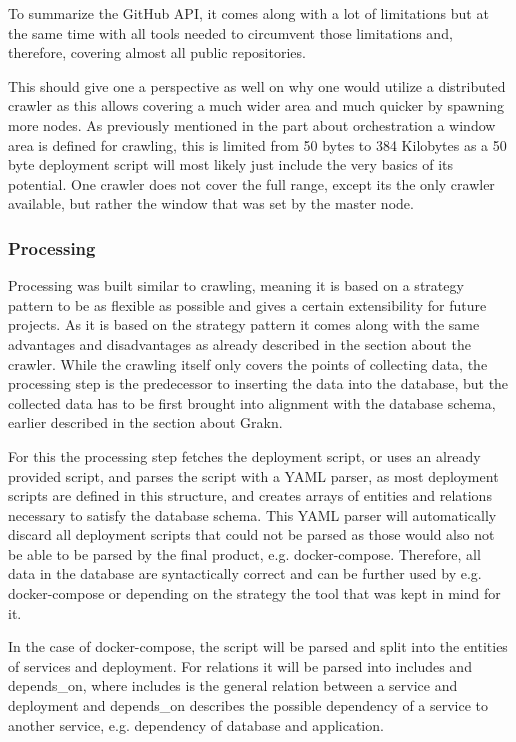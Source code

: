 To summarize the GitHub API, it comes along with a lot of limitations but at the same time with all tools needed to circumvent those limitations and, therefore, covering almost all public repositories.

This should give one a perspective as well on why one would utilize a distributed crawler as this allows covering a much wider area and much quicker by spawning more nodes. As previously mentioned in the part about orchestration a window area is defined for crawling, this is limited from 50 bytes to 384 Kilobytes as a 50 byte deployment script will most likely just include the very basics of its potential. One crawler does not cover the full range, except its the only crawler available, but rather the window that was set by the master node.

\subsubsection{Processing}
Processing was built similar to crawling, meaning it is based on a strategy pattern to be as flexible as possible and gives a certain extensibility for future projects. As it is based on the strategy pattern it comes along with the same advantages and disadvantages as already described in the section about the crawler.
While the crawling itself only covers the points of collecting data, the processing step is the predecessor to inserting the data into the database, but the collected data has to be first brought into alignment with the database schema, earlier described in the section about Grakn.

For this the processing step fetches the deployment script, or uses an already provided script, and parses the script with a YAML parser, as most deployment scripts are defined in this structure, and creates arrays of entities and relations necessary to satisfy the database schema. This YAML parser will automatically discard all deployment scripts that could not be parsed as those would also not be able to be parsed by the final product, e.g. docker-compose. Therefore, all data in the database are syntactically correct and can be further used by e.g. docker-compose or depending on the strategy the tool that was kept in mind for it.

In the case of docker-compose, the script will be parsed and split into the entities of services and deployment. For relations it will be parsed into includes and depends\_on, where includes is the general relation between a service and deployment and depends\_on describes the possible dependency of a service to another service, e.g. dependency of database and application.

